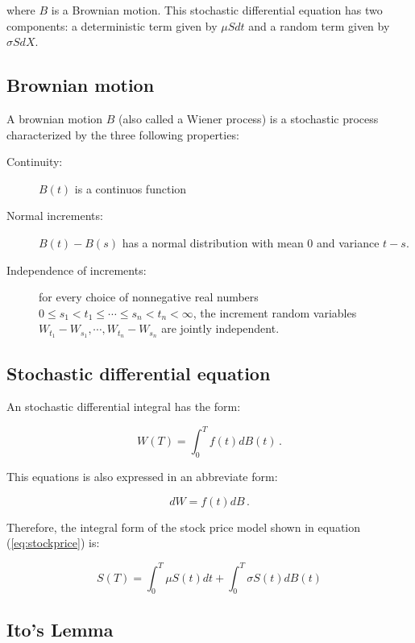\noindent where $B$ is a Brownian motion. This stochastic differential equation has two components: a deterministic term given by $\mu S dt$ and a random term given by $\sigma S dX$.

\subsection{Brownian motion}

A brownian motion $B$ (also called a Wiener process) is a stochastic process characterized by the three following properties:

\begin{description}
\item[Continuity:] $B(t)$ is a continuos function
\item[Normal increments:]  $B(t)-B(s)$ has a normal distribution with mean $0$ and variance $t-s$.
\item[Independence of increments:] for every choice of nonnegative real numbers $0 \leq s_1 <  t_1 \leq \cdots \leq s_n < t_n < \infty$, the increment random variables $W_{t_1} - W_{s_1}, \cdots, W_{t_n} - W_{s_n}$ are jointly independent.
\end{description}

\subsection{Stochastic differential equation}

An stochastic differential integral has the form:


\begin{equation}
W(T)=\int_0^T f(t)dB(t) \, .
\end{equation}

\noindent This equations is also expressed in an abbreviate form:

\begin{equation}
dW = f(t) dB \, .
\end{equation}

\noindent Therefore, the integral form of the stock price model shown in equation (\ref{eq:stockprice}) is:

\begin{equation}
S(T)=\int_0^T \mu S(t) dt + \int_0^T \sigma S(t) dB(t)
\end{equation}

\subsection{Ito's Lemma}


